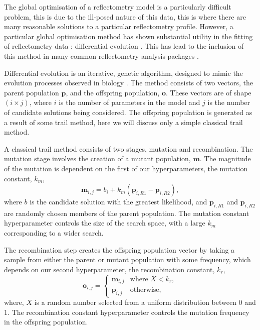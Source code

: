 \documentclass[
 reprint,
 superscriptaddress,
 amsmath,amssymb,
 aps,
]{revtex4-1}
\begin{document}
The global optimisation of a reflectometry model is a particularly difficult problem, this is due to the ill-posed nature of this data, this is where there are many reasonable solutions to a particular reflectometry profile.
However, a particular global optimisation method has shown substantial utility in the fitting of reflectometry data \cite{varderlee_comparison_2007}: differential evolution \cite{StornPrice_1997_DE,wormington_characterization_1999}.
This has lead to the inclusion of this method in many common reflectometry analysis packages \cite{bjorck_fitting_2011,nelson_refnx_2019,kienzle_ncnr_nodate}.

Differential evolution is an iterative, genetic algorithm, designed to mimic the evolution processes observed in biology \cite{holland_adaptation_1992}.
The method consists of two vectors, the parent population $\mathbf{p}$, and the offspring population, $\mathbf{o}$.
These vectors are of shape $(i \times j)$, where $i$ is the number of parameters in the model and $j$ is the number of candidate solutions being considered.
The offspring population is generated as a result of some trail method, here we will discuss only a simple classical trail method.

A classical trail method consists of two stages, mutation and recombination.
The mutation stage involves the creation of a mutant population, $\mathbf{m}$.
The magnitude of the mutation is dependent on the first of our hyperparameters, the mutation constant, $k_m$,
%
\begin{equation}
    \mathbf{m}_{i,j} = b_i + k_m (\mathbf{p}_{i, R1} - \mathbf{p}_{i, R2}),
\end{equation}
%
where $b$ is the candidate solution with the greatest likelihood, and $\mathbf{p}_{i, R1}$ and $\mathbf{p}_{i, R2}$ are randomly chosen members of the parent population.
The mutation constant hyperparameter controls the size of the search space, with a large $k_m$ corresponding to a wider search.

The recombination step creates the offspring population vector by taking a sample from either the parent or mutant population with some frequency, which depends on our second hyperparameter, the recombination constant, $k_r$,
%
\begin{equation}
    \mathbf{o}_{i, j} =
    \begin{cases}
        \mathbf{m}_{i, j} & \text{where } X < k_r,\\
        \mathbf{p}_{i, j} & \text{otherwise},
    \end{cases}
\end{equation}
%
where, $X$ is a random number selected from a uniform distribution between 0 and 1.
The recombination constant hyperparameter controls the mutation frequency in the offspring population.
\end{document}
